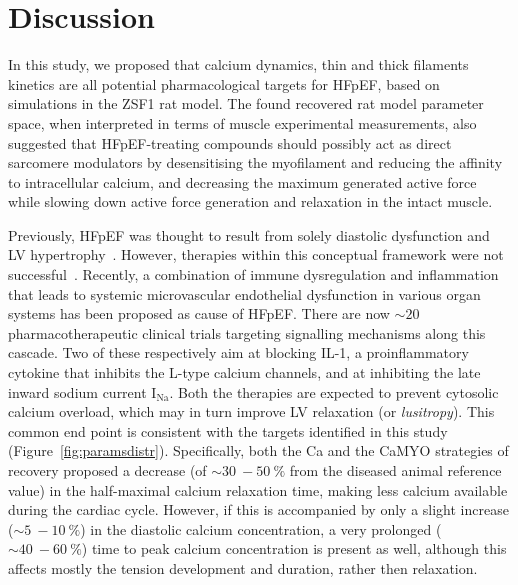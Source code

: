 %
%
%
\section{Discussion}\label{sec:ch7discussion}

\noindent
In this study, we proposed that calcium dynamics, thin and thick filaments kinetics are all potential pharmacological targets for HFpEF, based on simulations in the ZSF1 rat model. The found recovered rat model parameter space, when interpreted in terms of muscle experimental measurements, also suggested that HFpEF-treating compounds should possibly act as direct sarcomere modulators by desensitising the myofilament and reducing the affinity to intracellular calcium, and decreasing the maximum generated active force while slowing down active force generation and relaxation in the intact muscle.

Previously, HFpEF was thought to result from solely diastolic dysfunction and LV hypertrophy~\cite{Patel:2019}. However, therapies within this conceptual framework were not successful~\cite{Cleland:2014}. Recently, a combination of immune dysregulation and inflammation that leads to systemic microvascular endothelial dysfunction in various organ systems has been proposed as cause of HFpEF. There are now $\sim 20$ pharmacotherapeutic clinical trials targeting signalling mechanisms along this cascade. Two of these respectively aim at blocking IL-1, a proinflammatory cytokine that inhibits the L-type calcium channels, and at inhibiting the late inward sodium current $\text{I}_{\text{Na}}$. Both the therapies are expected to prevent cytosolic calcium overload, which may in turn improve LV relaxation (or \textit{lusitropy}). This common end point is consistent with the targets identified in this study (Figure~\ref{fig:paramsdistr}). Specifically, both the Ca and the CaMYO strategies of recovery proposed a decrease (of $\sim\SI{30}{}-\SI{50}{\percent}$ from the diseased animal reference value) in the half-maximal calcium relaxation time, making less calcium available during the cardiac cycle. However, if this is accompanied by only a slight increase ($\sim\SI{5}{}-\SI{10}{\percent}$) in the diastolic calcium concentration, a very prolonged ($\sim\SI{40}{}-\SI{60}{\percent}$) time to peak calcium concentration is present as well, although this affects mostly the tension development and duration, rather then relaxation.

